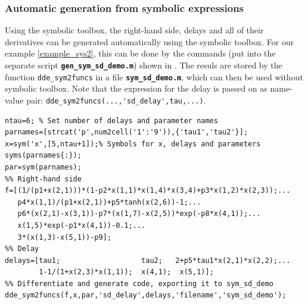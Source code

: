 \documentclass[10pt]{scrartcl}
\newcommand{\file}[1]{\textbf{\texttt{#1}}}
\newcommand{\blist}[1]{\mbox{\lstinline!#1!}}
\begin{document}



\subsubsection{Automatic generation from symbolic expressions}
\label{sec:symbsd}
Using the symbolic toolbox, the right-hand side, delays and all of
their derivatives can be generated automatically using the symbolic
toolbox. For our example \eqref{example_sys2}, this can be done by the
commands (put into the separate script \file{gen\_sym\_sd\_demo.m})
shown in . The resuls are stored by the function
\blist{dde_sym2funcs} in a file \file{sym\_sd\_demo.m}, which can then
be used without symbolic toolbox. Note that the expression for the
delay is passed on as name-value pair: \blist{dde_sym2funcs(...,'sd_delay',tau,...)}.

\begin{lstlisting}[float,frame=lines,label=sd_symbolic,caption={Definition for right-hand side, delays and all derivatives of \eqref{example_sys2} using the symbolic toolbox. See \Cref{sd_rhs} for manually provided right-hand sides. See \Cref{sec:funcs} for how to use the generated functions.}]
ntau=6; % Set number of delays and parameter names
parnames=[strcat('p',num2cell('1':'9')),{'tau1','tau2'}];
x=sym('x',[5,ntau+1]);% Symbols for x, delays and parameters
syms(parnames{:});
par=sym(parnames);
%% Right-hand side
f=[(1/(p1+x(2,1)))*(1-p2*x(1,1)*x(1,4)*x(3,4)+p3*x(1,2)*x(2,3));...
   p4*x(1,1)/(p1+x(2,1))+p5*tanh(x(2,6))-1;...
   p6*(x(2,1)-x(3,1))-p7*(x(1,7)-x(2,5))*exp(-p8*x(4,1));...
   x(1,5)*exp(-p1*x(4,1))-0.1;...
   3*(x(1,3)-x(5,1))-p9];
%% Delay
delays=[tau1;                   tau2;   2+p5*tau1*x(2,1)*x(2,2);...
        1-1/(1+x(2,3)*x(1,1));  x(4,1);  x(5,1)];
%% Differentiate and generate code, exporting it to sym_sd_demo
dde_sym2funcs(f,x,par,'sd_delay',delays,'filename','sym_sd_demo');
\end{lstlisting}
\end{document}
